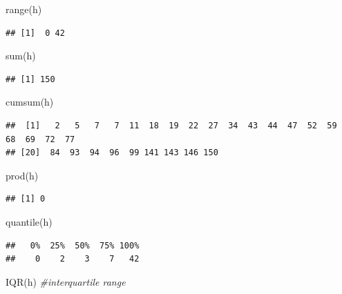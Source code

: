 \documentclass[
]{book}
\newenvironment{Shaded}{\begin{snugshade}}{\end{snugshade}}
\newcommand{\CommentTok}[1]{\textcolor[rgb]{0.56,0.35,0.01}{\textit{#1}}}
\newcommand{\FunctionTok}[1]{\textcolor[rgb]{0.00,0.00,0.00}{#1}}
\newcommand{\NormalTok}[1]{#1}
\begin{document}
\begin{Shaded}
\begin{Highlighting}[]
\FunctionTok{range}\NormalTok{(h)}
\end{Highlighting}
\end{Shaded}

\begin{verbatim}
## [1]  0 42
\end{verbatim}

\begin{Shaded}
\begin{Highlighting}[]
\FunctionTok{sum}\NormalTok{(h)}
\end{Highlighting}
\end{Shaded}

\begin{verbatim}
## [1] 150
\end{verbatim}

\begin{Shaded}
\begin{Highlighting}[]
\FunctionTok{cumsum}\NormalTok{(h)}
\end{Highlighting}
\end{Shaded}

\begin{verbatim}
##  [1]   2   5   7   7  11  18  19  22  27  34  43  44  47  52  59  68  69  72  77
## [20]  84  93  94  96  99 141 143 146 150
\end{verbatim}

\begin{Shaded}
\begin{Highlighting}[]
\FunctionTok{prod}\NormalTok{(h)}
\end{Highlighting}
\end{Shaded}

\begin{verbatim}
## [1] 0
\end{verbatim}

\begin{Shaded}
\begin{Highlighting}[]
\FunctionTok{quantile}\NormalTok{(h)}
\end{Highlighting}
\end{Shaded}

\begin{verbatim}
##   0%  25%  50%  75% 100% 
##    0    2    3    7   42
\end{verbatim}

\begin{Shaded}
\begin{Highlighting}[]
\FunctionTok{IQR}\NormalTok{(h) }\CommentTok{\#interquartile range}
\end{Highlighting}
\end{Shaded}
\end{document}
